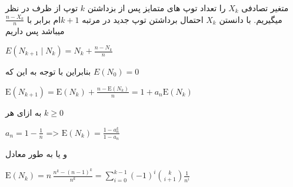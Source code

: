 
متغیر تصادفی $X_k$ را تعداد توپ های متمایز پس از بزداشتن $k$ توپ از ظرف در نظر میگیریم. با دانستن $X_k$ احتمال برداشتن توپ جدید در مرتبه $k+1$ام  برابر با $\frac{n-X_k}{n}$ میباشد پس داریم\\
\centerline{$E(N_{k+1}\mid N_k)=N_k+\frac{n-N_k}{n}$}
بنابراین با توجه به این که $E(N_0) =0$ \\
\centerline{$\mathrm E(N_{k+1})=\mathrm E(N_k)+\frac{n-\mathrm E(N_k)}n=1+a_n\mathrm E(N_k)$}
به ازای هر $k \geq 0$\\
\centerline{$a_n=1-\frac1n$ => $\mathrm E(N_k)=\frac{1-a_n^k}{1-a_n}$}
و یا به طور معادل\\
\centerline{$\mathrm E(N_k)=n\,\frac{n^k-(n-1)^k}{n^{k}}=\sum\limits_{i=0}^{k-1}(-1)^{i}{k\choose i+1}\frac1{n^i}$}